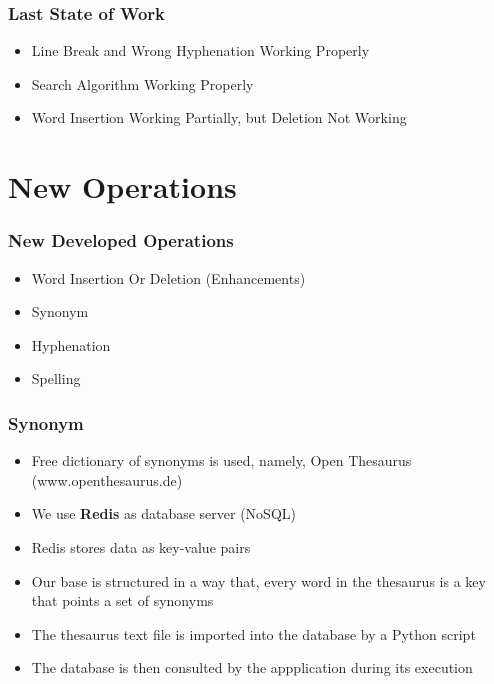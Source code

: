 \documentclass{beamer}
\begin{document}
\begin{frame}
\frametitle{Last State of Work}
\begin{itemize}
\item Line Break and Wrong Hyphenation Working Properly
\item Search Algorithm Working Properly
\item Word Insertion Working Partially, but Deletion Not Working
\end{itemize}
\end{frame}

\section{New Operations}
\begin{frame}
\frametitle{New Developed Operations}
\begin{itemize}
	\item Word Insertion Or Deletion (Enhancements)
	\item Synonym
	\item Hyphenation
	\item Spelling
\end{itemize}
\end{frame}

\begin{frame}
\frametitle{Synonym}
\begin{itemize}
	\item Free dictionary of synonyms is used, namely, Open Thesaurus (www.openthesaurus.de)
	\item We use \textbf{Redis} as database server (NoSQL)
	\item Redis stores data as key-value pairs
	\item Our base is structured in a way that, every word in the thesaurus is a key that points a set of synonyms
	\item The thesaurus text file is imported into the database by a Python script
	\item The database is then consulted by the appplication during its execution
\end{itemize}
\end{frame}
\end{document}
